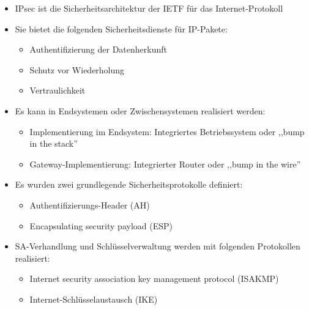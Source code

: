 \documentclass[a4paper]{article}
\begin{document}
\begin{multicols}{3}
    \begin{itemize}
        \item
              IPsec ist die Sicherheitsarchitektur der IETF für das
              Internet-Protokoll
        \item
              Sie bietet die folgenden Sicherheitsdienste für IP-Pakete:

              \begin{itemize}
                  \item
                        Authentifizierung der Datenherkunft
                  \item
                        Schutz vor Wiederholung
                  \item
                        Vertraulichkeit
              \end{itemize}
        \item
              Es kann in Endsystemen oder Zwischensystemen realisiert werden:

              \begin{itemize}
                  \item
                        Implementierung im Endsystem: Integriertes Betriebssystem oder
                        ,,bump in the stack''
                  \item
                        Gateway-Implementierung: Integrierter Router oder ,,bump in the
                        wire''
              \end{itemize}
        \item
              Es wurden zwei grundlegende Sicherheitsprotokolle definiert:

              \begin{itemize}
                  \item
                        Authentifizierungs-Header (AH)
                  \item
                        Encapsulating security payload (ESP)
              \end{itemize}
        \item
              SA-Verhandlung und Schlüsselverwaltung werden mit folgenden
              Protokollen realisiert:

              \begin{itemize}
                  \item
                        Internet security association key management protocol (ISAKMP)
                  \item
                        Internet-Schlüsselaustausch (IKE)
              \end{itemize}
    \end{itemize}



\end{multicols}
\end{document}
